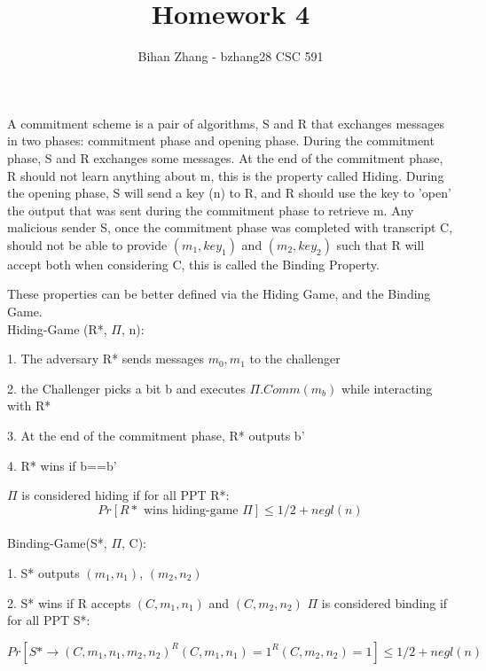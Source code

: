 \documentclass[12pt]{article}
\newenvironment{question}[2][Question]{\begin{trivlist}
		\item[\hskip \labelsep {\bfseries #1}\hskip \labelsep {\bfseries #2.}]}{\end{trivlist}}
\begin{document}
	
	

	\title{Homework 4}%
	\author{Bihan Zhang - bzhang28 %
		CSC 591} %
	
	\maketitle
	
	
	\begin{question}{1} 
A commitment scheme is a pair of algorithms, S and R that exchanges messages in two phases: commitment phase and opening phase. During the commitment phase, S and R exchanges some messages. At the end of the commitment phase, R should not learn anything about m, this is the property called Hiding. During the opening phase, S will send a key (n) to R, and R should use the key to 'open' the output that was sent during the commitment phase to retrieve m. Any malicious sender S, once the commitment phase was completed with transcript C, should not be able to provide $(m_1, key_1)$ and $(m_2, key_2)$ such that R will accept both when considering C, this is called the Binding Property. 

These properties can be better defined via the Hiding Game, and the Binding Game.\\

Hiding-Game (R*, $\Pi$, n):

1. The adversary R* sends messages $m_0, m_1$ to the challenger

2. the Challenger picks a bit b and executes $\Pi.Comm(m_b)$ while interacting with R*

3. At the end of the commitment phase, R* outputs b'

4. R* wins if b==b'

$\Pi$ is considered hiding if for all PPT R*:
$$Pr[R* \text{ wins hiding-game } \Pi] \leq 1/2 + negl(n)$$\\

Binding-Game(S*, $\Pi$, C):

1. S* outputs $(m_1, n_1)$, $(m_2, n_2)$

2. S* wins if R accepts $(C, m_1, n_1)$ and $(C, m_2, n_2)$
$\Pi$ is considered binding if for all PPT S*:

$$Pr[S* \rightarrow (C, m_1, n_1, m_2, n_2) ^ R(C, m_1, n_1)=1 ^R(C, m_2, n_2)=1 ] \leq 1/2 + negl(n)$$
		
	\end{question}
		
\end{document}
